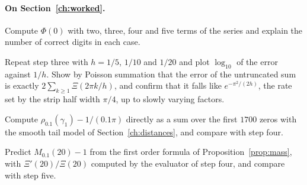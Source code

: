 \paragraph{On Section~\ref{ch:worked}.}
\begin{exercises}
\item Compute $\Phi(0)$ with two, three, four and five terms of the series and explain the number of correct digits in each case.
\item Repeat step three with $h=1/5$, $1/10$ and $1/20$ and plot $\log_{10}$ of the error against $1/h$. Show by Poisson summation that the error of the untruncated sum is exactly $2\sum_{k\ge1}\Xi(2\pi k/h)$, and confirm that it falls like $e^{-\pi^2/(2h)}$, the rate set by the strip half width $\pi/4$, up to slowly varying factors.
\item Compute $\rho_{0.1}(\gamma_1)-1/(0.1\pi)$ directly as a sum over the first $1700$ zeros with the smooth tail model of Section~\ref{ch:distances}, and compare with step four.
\item\label{ex:ch5b:mass} Predict $M_{0.1}(20)-1$ from the first order formula of Proposition~\ref{prop:mass}, with $\Xi'(20)/\Xi(20)$ computed by the evaluator of step four, and compare with step five.
\end{exercises}
